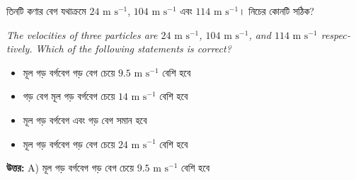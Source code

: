 \documentclass[12pt, a4paper]{article}
\begin{document}
\vspace{2em}

\begin{tcolorbox}[questionbox={প্রশ্ন (Question) 6}]
    \noindent
    তিনটি কণার বেগ যথাক্রমে $24\text{ m s}^{-1}$, $104\text{ m s}^{-1}$ এবং $114\text{ m s}^{-1}$। নিচের কোনটি সঠিক?
    
    \vspace{0.8em}
    \begin{english}
    \noindent\textit{\color{darkgray}
    The velocities of three particles are $24\text{ m s}^{-1}$, $104\text{ m s}^{-1}$, and $114\text{ m s}^{-1}$ respectively. Which of the following statements is correct?
    }
    \end{english}
\end{tcolorbox}

\begin{itemize}[label={}, leftmargin=1cm, itemsep=0.5em]
    \item[\textbf{A)}] মূল গড় বর্গবেগ গড় বেগ চেয়ে $9.5\text{ m s}^{-1}$ বেশি হবে
    \item[\textbf{B)}] গড় বেগ মূল গড় বর্গবেগ চেয়ে $14\text{ m s}^{-1}$ বেশি হবে
    \item[\textbf{C)}] মূল গড় বর্গবেগ এবং গড় বেগ সমান হবে
    \item[\textbf{D)}] মূল গড় বর্গবেগ গড় বেগ চেয়ে $24\text{ m s}^{-1}$ বেশি হবে
\end{itemize}

\vspace{0.5em}
\begin{tcolorbox}[answerbox]
    \textbf{\color{success} উত্তর:} A) মূল গড় বর্গবেগ গড় বেগ চেয়ে $9.5\text{ m s}^{-1}$ বেশি হবে
\end{tcolorbox}
\vspace{1em}
\end{document}
